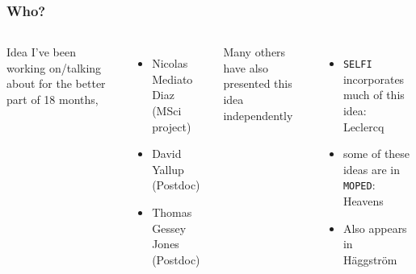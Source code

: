 \documentclass[aspectratio=169]{beamer}
\begin{document}
\begin{frame}
    \frametitle{Who?}
    \begin{columns}
    Idea I've been working on/talking about for the better part of 18 months,
    \begin{itemize}
        \item Nicolas Mediato Diaz (MSci project)
        \item David Yallup (Postdoc)
        \item Thomas Gessey Jones (Postdoc)
    \end{itemize}

    Many others have also presented this idea independently
    \begin{itemize}
        \item \texttt{SELFI} incorporates much of this idea: Leclercq~
        \item some of these ideas are in \texttt{MOPED}: Heavens~
        \item Also appears in Häggström~
    \end{itemize}
        

\end{columns}
\end{frame}
\end{document}
